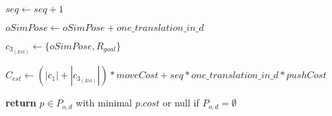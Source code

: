 \begin{algorithm}[H]
\begin{algorithmic}[1]
          \State $seq \gets seq + 1$

          \State $oSimPose \gets oSimPose + one\_translation\_in\_d$

          \State $c_{3_{(Est)}} \gets \{oSimPose, R_{goal}\}$

          \State $C_{est} \gets (|c_{1}| + |c_{3_{(Est)}}|) * moveCost + seq * one\_translation\_in\_d * pushCost$

        \EndWhile

      \EndFor

    \State \textbf{return} $p \in P_{o,d}$ with minimal $p.cost$ or null if $P_{o,d} = \emptyset$

    \EndProcedure

  \end{algorithmic}
\end{algorithm}
